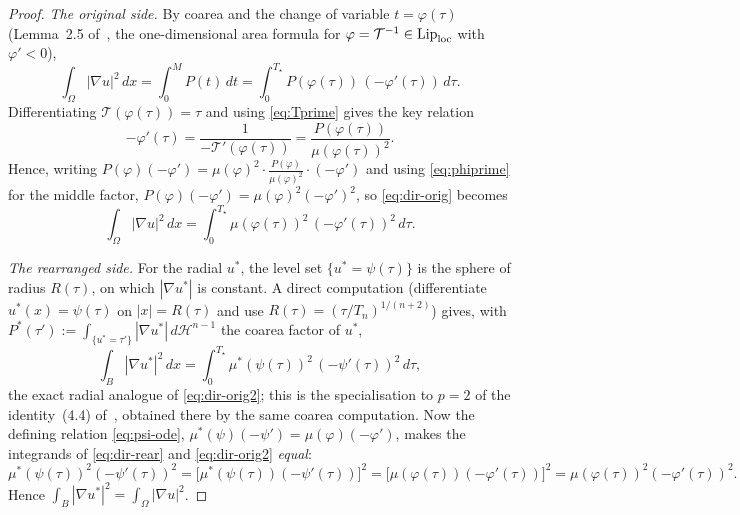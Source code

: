 \documentclass[11pt]{amsart}
\theoremstyle{definition}
\newcommand{\Om}{\Omega}
\newcommand{\HH}{\mathcal H}
\newcommand{\abs}[1]{\left|#1\right|}
\newcommand{\dx}{\,dx}
\newcommand{\dt}{\,dt}
\newcommand{\dH}{\,d\HH^{n-1}}
\begin{document}
\begin{proof}
\emph{The original side.} By coarea and the change of variable
$t=\varphi(\tau)$ (Lemma~2.5 of~\cite{Brasco2014}, the one-dimensional area
formula for $\varphi=\mathcal T^{-1}\in\mathrm{Lip}_{\rm loc}$ with
$\varphi'<0$),
\begin{equation}\label{eq:dir-orig}
  \int_\Om\abs{\nabla u}^2\dx
  =\int_0^M P(t)\dt
  =\int_0^{T_\star}P(\varphi(\tau))\,(-\varphi'(\tau))\,d\tau .
\end{equation}
Differentiating $\mathcal T(\varphi(\tau))=\tau$ and using
\eqref{eq:Tprime} gives the key relation
\begin{equation}\label{eq:phiprime}
  -\varphi'(\tau)=\frac{1}{-\mathcal T'(\varphi(\tau))}
  =\frac{P(\varphi(\tau))}{\mu(\varphi(\tau))^2}.
\end{equation}
Hence, writing $P(\varphi)(-\varphi')=\mu(\varphi)^2\cdot
\frac{P(\varphi)}{\mu(\varphi)^2}\cdot(-\varphi')$ and using
\eqref{eq:phiprime} for the middle factor,
$P(\varphi)(-\varphi')=\mu(\varphi)^2(-\varphi')^2$, so \eqref{eq:dir-orig}
becomes
\begin{equation}\label{eq:dir-orig2}
  \int_\Om\abs{\nabla u}^2\dx
  =\int_0^{T_\star}\mu(\varphi(\tau))^2\,(-\varphi'(\tau))^2\,d\tau.
\end{equation}

\emph{The rearranged side.} For the radial $u^*$, the level set
$\{u^*=\psi(\tau)\}$ is the sphere of radius $R(\tau)$, on which
$\abs{\nabla u^*}$ is constant. A direct computation (differentiate
$u^*(x)=\psi(\tau)$ on $\abs x=R(\tau)$ and use $R(\tau)=(\tau/T_n)^{1/(n+2)}$)
gives, with $P^*(\tau'):=\int_{\{u^*=\tau'\}}\abs{\nabla u^*}\dH$ the coarea
factor of $u^*$,
\begin{equation}\label{eq:dir-rear}
  \int_B\abs{\nabla u^*}^2\dx
  =\int_0^{T_\star}\mu^*(\psi(\tau))^2\,(-\psi'(\tau))^2\,d\tau,
\end{equation}
the exact radial analogue of \eqref{eq:dir-orig2}; this is the
specialisation to $p=2$ of the identity~(4.4)
of~\cite{Brasco2014}, obtained there by the same coarea computation. Now
the defining relation \eqref{eq:psi-ode},
$\mu^*(\psi)(-\psi')=\mu(\varphi)(-\varphi')$, makes the integrands of
\eqref{eq:dir-rear} and \eqref{eq:dir-orig2} \emph{equal}:
\[
  \mu^*(\psi(\tau))^2(-\psi'(\tau))^2
  =\bigl[\mu^*(\psi(\tau))(-\psi'(\tau))\bigr]^2
  =\bigl[\mu(\varphi(\tau))(-\varphi'(\tau))\bigr]^2
  =\mu(\varphi(\tau))^2(-\varphi'(\tau))^2 .
\]
Hence $\int_B\abs{\nabla u^*}^2=\int_\Om\abs{\nabla u}^2$.
\end{proof}
\end{document}
